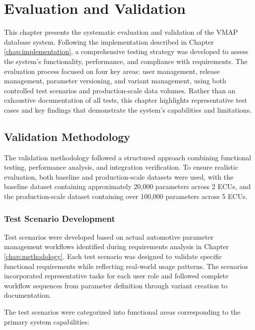 \chapter{Evaluation and Validation}
\label{chap:evaluation}

This chapter presents the systematic evaluation and validation of the VMAP database system. Following the implementation described in Chapter \ref{chap:implementation}, a comprehensive testing strategy was developed to assess the system's functionality, performance, and compliance with requirements. The evaluation process focused on four key areas: user management, release management, parameter versioning, and variant management, using both controlled test scenarios and production-scale data volumes. Rather than an exhaustive documentation of all tests, this chapter highlights representative test cases and key findings that demonstrate the system's capabilities and limitations.

\section{Validation Methodology}
\label{sec:validation-methodology}

The validation methodology followed a structured approach combining functional testing, performance analysis, and integration verification. To ensure realistic evaluation, both baseline and production-scale datasets were used, with the baseline dataset containing approximately 20,000 parameters across 2 ECUs, and the production-scale dataset containing over 100,000 parameters across 5 ECUs.

\subsection{Test Scenario Development}
\label{subsec:test-scenario-development}

Test scenarios were developed based on actual automotive parameter management workflows identified during requirements analysis in Chapter \ref{chap:methodology}. Each test scenario was designed to validate specific functional requirements while reflecting real-world usage patterns. The scenarios incorporated representative tasks for each user role and followed complete workflow sequences from parameter definition through variant creation to documentation.

The test scenarios were categorized into functional areas corresponding to the primary system capabilities:

